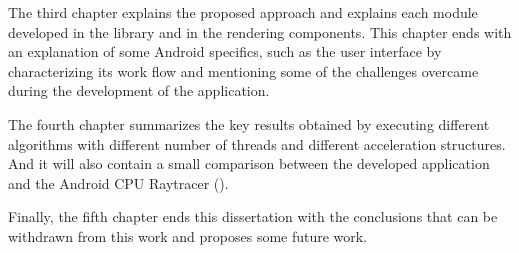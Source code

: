 \par
The third chapter explains the proposed approach and explains each module developed in the library and in the rendering components.
This chapter ends with an explanation of some Android specifics, such as the user interface by characterizing its work flow and mentioning some of the challenges overcame during the development of the application.

\par
The fourth chapter summarizes the key results obtained by executing different algorithms with different number of threads and different acceleration structures.
And it will also contain a small comparison between the developed application and the Android CPU Raytracer (\cite{Android_CPU_Raytracer}).

\par
Finally, the fifth chapter ends this dissertation with the conclusions that can be withdrawn from this work and proposes some future work.